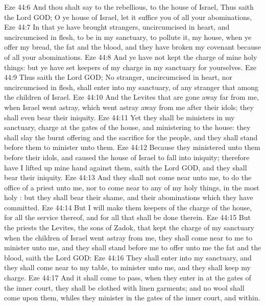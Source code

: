 \vs Eze 44:6 And thou shalt say to the rebellious,  to the house of Israel, Thus saith the Lord GOD; O ye house of Israel, let it suffice you of all your abominations,
\vs Eze 44:7 In that ye have brought  strangers, uncircumcised in heart, and uncircumcised in flesh, to be in my sanctuary, to pollute it,  my house, when ye offer my bread, the fat and the blood, and they have broken my covenant because of all your abominations.
\vs Eze 44:8 And ye have not kept the charge of mine holy things: but ye have set keepers of my charge in my sanctuary for yourselves.
\vs Eze 44:9 Thus saith the Lord GOD; No stranger, uncircumcised in heart, nor uncircumcised in flesh, shall enter into my sanctuary, of any stranger that  among the children of Israel.
\vs Eze 44:10 And the Levites that are gone away far from me, when Israel went astray, which went astray away from me after their idols; they shall even bear their iniquity.
\vs Eze 44:11 Yet they shall be ministers in my sanctuary,  charge at the gates of the house, and ministering to the house: they shall slay the burnt offering and the sacrifice for the people, and they shall stand before them to minister unto them.
\vs Eze 44:12 Because they ministered unto them before their idols, and caused the house of Israel to fall into iniquity; therefore have I lifted up mine hand against them, saith the Lord GOD, and they shall bear their iniquity.
\vs Eze 44:13 And they shall not come near unto me, to do the office of a priest unto me, nor to come near to any of my holy things, in the most holy : but they shall bear their shame, and their abominations which they have committed.
\vs Eze 44:14 But I will make them keepers of the charge of the house, for all the service thereof, and for all that shall be done therein.
\vs Eze 44:15 But the priests the Levites, the sons of Zadok, that kept the charge of my sanctuary when the children of Israel went astray from me, they shall come near to me to minister unto me, and they shall stand before me to offer unto me the fat and the blood, saith the Lord GOD:
\vs Eze 44:16 They shall enter into my sanctuary, and they shall come near to my table, to minister unto me, and they shall keep my charge.
\vs Eze 44:17 And it shall come to pass,  when they enter in at the gates of the inner court, they shall be clothed with linen garments; and no wool shall come upon them, whiles they minister in the gates of the inner court, and within.
